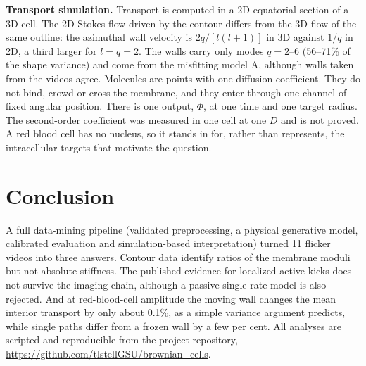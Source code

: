 \documentclass[conference]{IEEEtran}
\begin{document}
\textbf{Transport simulation.} Transport is computed in a 2D equatorial section of a 3D cell. The 2D
Stokes flow driven by the contour differs from the 3D flow of the same outline: the azimuthal wall
velocity is $2q/[l(l+1)]$ in 3D against $1/q$ in 2D, a third larger for $l = q = 2$. The walls carry
only modes $q = 2$--6 (56--71\% of the shape variance) and come from the misfitting model A, although
walls taken from the videos agree. Molecules are points with one diffusion coefficient. They do not
bind, crowd or cross the membrane, and they enter through one channel of fixed angular position.
There is one output, $\Phi$, at one time and one target radius. The second-order coefficient was
measured in one cell at one $D$ and is not proved. A red blood cell has no nucleus, so it stands in
for, rather than represents, the intracellular targets that motivate the question.

\section{Conclusion}
A full data-mining pipeline (validated preprocessing, a physical generative model, calibrated
evaluation and simulation-based interpretation) turned 11 flicker videos into three answers. Contour
data identify ratios of the membrane moduli but not absolute stiffness. The published evidence for
localized active kicks does not survive the imaging chain, although a passive single-rate model is
also rejected. And at red-blood-cell amplitude the moving wall changes the mean interior transport
by only about 0.1\%, as a simple variance argument predicts, while single paths differ from a
frozen wall by a few per cent. All analyses are scripted and reproducible from
the project repository, \url{https://github.com/tlstellGSU/brownian_cells}.



\end{document}
